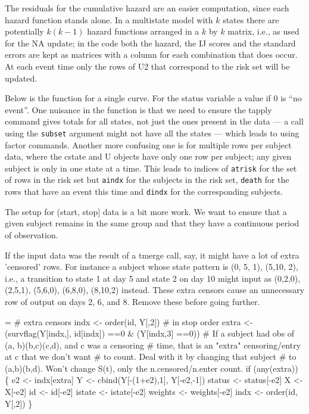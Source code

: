 \documentclass{article}
\newcommand{\code}[1]{\texttt{#1}}
\begin{document}
The residuals for the cumulative hazard are an easier computation, since each
hazard function stands alone.  In a multistate model with $k$ states there
are potentially $k(k-1)$ hazard functions arranged in a $k$ by $k$ matrix,
i.e., as used for the NA update; in the code both the hazard, the IJ scores
and the standard errors are kept as matrices with a column for each combination
that does occur.  At each event time only the rows of U2 that correspond to
the risk set will be updated.  

Below is the function for a single curve.
For the status variable a value if 0 is ``no event''.  
One nuisance in the function is that we need to ensure the
tapply command gives totals for all states, not just the ones present in the
data --- a call using the \code{subset} argument might not have all the states
--- which leads to using factor commands.
Another more confusing one is for multiple rows per subject data, where the 
cstate and U objects have only one row per subject; 
any given subject is only in one state at a time.
This leads to indices of \Verb!atrisk! for the set of rows in the risk set but
\Verb!aindx! for the subjects in the risk set, \Verb?death? for the rows that have
an event this time and \Verb!dindx! for the corresponding subjects.

The setup for (start, stop] data is a bit more work.  
We want to ensure that a given subject remains in the same group and that
they have a continuous period of observation.

If the input data was the result of a tmerge call, say, it might have a
lot of extra 'censored' rows.  For instance a subject whose state pattern
is (0, 5, 1), (5,10, 2), i.e., a transition to state 1 at day 5 and state 2
on day 10 might input as (0,2,0), (2,5,1), (5,6,0), (6,8,0), (8,10,2)
instead.  
These extra censors cause an
unnecessary row of output on days 2, 6, and 8.  
Remove these before going further.  

\begin{nwchunk}
=
 # extra censors
 indx <- order(id, Y[,2])   # in stop order
 extra <- (survflag(Y[indx,], id[indx]) ==0 & (Y[indx,3] ==0))
 # If a subject had obs of (a, b)(b,c)(c,d), and c was a censoring
 #  time, that is an "extra" censoring/entry at c that we don't want
 #  to count.  Deal with it by changing that subject
 #  to (a,b)(b,d).  Won't change S(t), only the n.censored/n.enter count.
 if (any(extra)) \{
     e2 <- indx[extra]
     Y <- cbind(Y[-(1+e2),1], Y[-e2,-1])
     status <- status[-e2]
     X <- X[-e2]
     id <- id[-e2]
     istate <- istate[-e2]
     weights <- weights[-e2]
     indx <- order(id, Y[,2])
 \}
\end{nwchunk}
\end{document}
